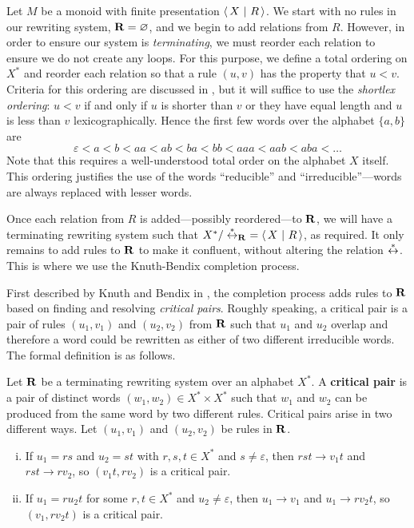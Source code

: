 Let $M$ be a monoid with finite presentation $\left\langle\,X ~\middle|~ R\,\right\rangle$.
We start with no rules in our rewriting system, $\mathbf{R} = \varnothing$, and
we begin to add relations from $R$.  However, in order to ensure our system is
\textit{terminating}, we must reorder each relation to ensure we do not create
any loops.  For this purpose, we define a total ordering on $X^*$ and reorder
each relation so that a rule $(u, v)$ has the property that $u < v$.  Criteria
for this ordering are discussed in \cite[p.~420]{cgt}, but it will suffice to
use the \textit{shortlex ordering}: $u < v$ if and only if $u$ is shorter than
$v$ or they have equal length and $u$ is less than $v$ lexicographically.  Hence the
first few words over the alphabet $\{a, b\}$ are
$$\varepsilon < a < b < aa < ab < ba < bb < aaa < aab < aba < \ldots$$
Note that this requires a well-understood total order on the alphabet $X$
itself.  This ordering justifies the use of the words ``reducible'' and
``irreducible''---words are always replaced with lesser words.

Once each relation from $R$ is added---possibly reordered---to $\mathbf{R}$, we
will have a terminating rewriting system such that
$X^* / \stackrel{*}{\leftrightarrow}_{\mathbf{R}}\ = \left\langle\,X ~\middle|~ R\,\right\rangle$, as required.  It only remains to add
rules to $\mathbf{R}$ to make it confluent, without altering the relation
$\stackrel{*}{\leftrightarrow}$.  This is where we use the Knuth-Bendix completion process.

First described by Knuth and Bendix in \cite{knuth_bendix}, the completion
process adds rules to $\mathbf{R}$ based on finding and resolving
\textit{critical pairs}.  Roughly speaking, a critical pair is a pair of rules $(u_1, v_1)$ and
$(u_2, v_2)$ from $\mathbf{R}$ such that $u_1$ and $u_2$ overlap and therefore a word could be
rewritten as either of two different irreducible words.  The formal definition
is as follows.

\begin{definition}
  \label{def:critical-pair}
  Let $\mathbf{R}$ be a terminating rewriting system over an alphabet $X^*$.  A
  \textbf{critical pair} is a pair of distinct words
  $(w_1, w_2) \in X^* \times X^*$ such that $w_1$ and $w_2$ can be produced from
  the same word by two different rules.
  Critical pairs arise in two different ways.
  Let $(u_1, v_1)$ and $(u_2, v_2)$ be rules in $\mathbf{R}$.
  \begin{enumerate}[(i)]
  \item If $u_1 = rs$ and $u_2 = st$ with $r,s,t \in X^*$ and
    $s \neq \varepsilon$, then $rst \to v_1t$ and $rst \to rv_2$, so
    $(v_1t, rv_2)$ is a critical pair.
  \item If $u_1 = ru_2t$ for some $r,t \in X^*$ and $u_2 \neq \varepsilon$, then
    $u_1 \to v_1$ and $u_1 \to rv_2t$, so $(v_1, rv_2t)$ is a critical
    pair.
  \end{enumerate}
\end{definition}

